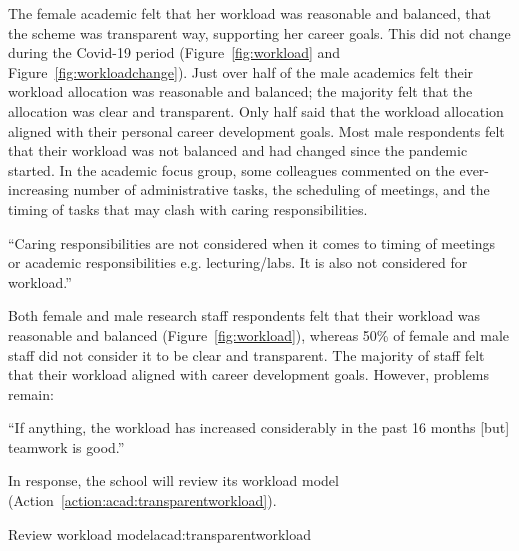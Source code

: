 The female academic felt that her workload was reasonable and balanced, that the scheme was transparent way, supporting her career goals. This did not change during the Covid-19 period (Figure~\ref{fig:workload} and Figure~\ref{fig:workloadchange}). 
Just over half of the male academics felt their workload allocation was reasonable and balanced; the majority felt that the allocation was clear and transparent. Only half said that the workload allocation aligned with their personal career development goals. Most male respondents felt that their workload was not balanced and had changed since the pandemic started. In the academic focus group, some colleagues commented on the ever-increasing number of administrative tasks, the scheduling of meetings, and the timing of tasks that may clash with caring responsibilities. 


\begin{myquote}
“Caring responsibilities are not considered when it comes to timing of meetings or academic responsibilities e.g. lecturing/labs. It is also not considered for workload.”
\end{myquote}

Both female and male  research staff respondents felt that their workload was reasonable and balanced (Figure~\ref{fig:workload}), whereas 50\% of female and male staff did not consider it to be clear and transparent. The majority of staff felt that their workload aligned with career development goals. However, problems remain:

\begin{myquote}
“If anything, the workload has increased considerably in the past 16 months [but] teamwork is good.”
\end{myquote}

In response, the school will review its workload model (Action~\ref{action:acad:transparentworkload}).


\begin{actionblock}{\ksspace{}Review workload model}{acad:transparentworkload}
\actreviewworkloadmodel
\hfill{
    \hypersetup{hidelinks}
    \hyperlink{c19}{\gotoactionsymbol{}}
}
\end{actionblock}




